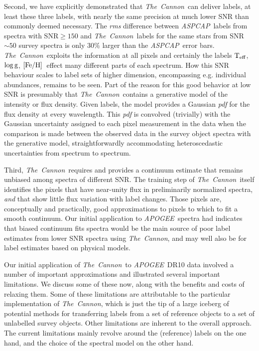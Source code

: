 \documentclass[12pt, preprint]{aastex}
\newcommand{\tc}{\textsl{The~Cannon}}
\newcommand{\apogee}{\textsl{APOGEE}}
\newcommand{\aspcap}{\textsl{ASPCAP}}
\newcommand{\teff}{\mbox{$\rm T_{eff}$}}
\newcommand{\feh}{\mbox{$\rm [Fe/H]$}}
\newcommand{\logg}{\mbox{$\rm \log g$}}
\begin{document}
Second, we have explicitly demonstrated that \tc\ can deliver labels, at least these three labels, 
with nearly the same precision at much lower SNR than commonly deemed necessary. 
The \textit{rms} difference between  \aspcap\ labels from spectra with SNR$\ge150$ and \tc\ labels
for the same stars from SNR$ \sim 50$ survey spectra is only 30\% larger than the \aspcap\ error bars. 
\tc\  exploits the information at all pixels and certainly the labels \teff, \logg, \feh\  effect many different parts of each spectrum. How this SNR behaviour scales to label sets of higher dimension, encompassing e.g. individual abundances, remains to be seen. Part of the reason for this good behavior at low SNR is presumably that
\tc\ contains a generative model of the intensity or flux density.
Given labels, the model provides a Gaussian \textit{pdf} for the flux density at every wavelength.
This \textit{pdf} is convolved (trivially) with the Gaussian uncertainty
assigned to each pixel measurement in the data when the comparison is
made between the observed data in the survey object spectra with the
generative model, straightforwardly accommodating
heteroscedastic uncertainties from spectrum to spectrum.

Third, \tc\ requires and provides a continuum estimate that remains  
unbiased among spectra of different SNR. The training step of \tc\ itself identifies the 
pixels that have near-unity flux in preliminarily normalized spectra, {\it and} that show little flux variation with 
label changes. Those pixels are, conceptually and practically, good approximations to pixels to which to fit a smooth continuum. Our initial application to \apogee\ spectra had indicates that biased continuum fits spectra would be the main source of poor label estimates from lower SNR spectra using \tc , and may well also be for label estimates based on physical models. 

Our initial application of \tc\ to \apogee\  DR10 data involved a number of important approximations and illustrated several important limitations. 
We discuss some of these now, along with the benefits and costs of relaxing
them. Some of these limitations are attributable to the 
particular implementation of \tc , which is just the tip of a large iceberg of potential
methods for transferring labels from a set of reference objects to a
set of unlabelled survey objects. Other limitations are inherent to the overall approach. 
The current limitations mainly revolve around the (reference) labels on the one hand, and the choice 
of the spectral model on the other hand. 
\end{document}

